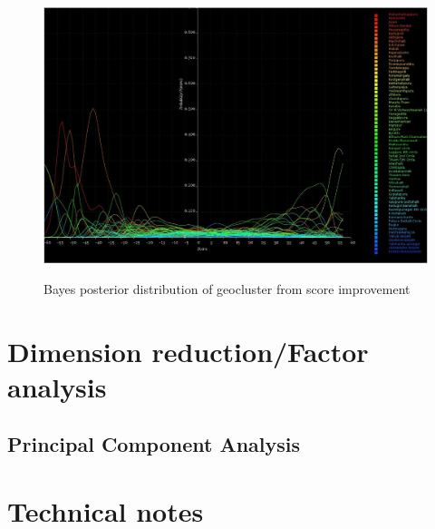 \documentclass[10pt]{article}
\begin{document}
\newpage
\begin{figure}
\caption{Bayes posterior distribution of geocluster from score improvement}
\label{BayesClusterFromImprovement}
\begin{center}
\includegraphics[width=160mm]{ReportMedia/BayesClusterFromImprovement.jpg}\\
\end{center}
\end{figure}
\newpage
\section{Dimension reduction/Factor analysis}
\newpage
\subsection{Principal Component Analysis}

\newpage
\section{Technical notes}
\end{document}
